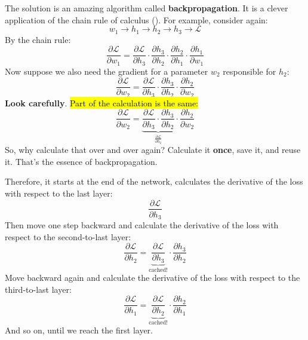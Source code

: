 \begin{remarkbox}
    \highspace
    \textcolor{Green3}{} The solution is an amazing algorithm called \textbf{backpropagation}. It is a clever application of the chain rule of calculus (). For example, consider again:
    \begin{equation*}
        w_1 \to h_1 \to h_2 \to h_3 \to \mathcal{L}
    \end{equation*}
    By the chain rule:
    \begin{equation*}
        \frac{\partial\mathcal{L}}{\partial w_1}
        =
        \frac{\partial\mathcal{L}}{\partial h_3} \cdot
        \frac{\partial h_3}{\partial h_2} \cdot
        \frac{\partial h_2}{\partial h_1} \cdot
        \frac{\partial h_1}{\partial w_1}
    \end{equation*}
    Now suppose we also need the gradient for a parameter $w_2$ responsible for $h_2$:
    \begin{equation*}
        \frac{\partial\mathcal{L}}{\partial w_2}
        =
        \frac{\partial\mathcal{L}}{\partial h_3} \cdot
        \frac{\partial h_3}{\partial h_2} \cdot
        \frac{\partial h_2}{\partial w_2}
    \end{equation*}
    \textbf{Look carefully}. \hl{Part of the calculation is the same:}
    \begin{equation*}
        \frac{\partial\mathcal{L}}{\partial w_2}
        =
        \underbrace{\frac{\partial\mathcal{L}}{\partial h_3} \cdot
        \frac{\partial h_3}{\partial h_2}}_{\frac{\partial\mathcal{L}}{\partial h_2}} \cdot
        \frac{\partial h_2}{\partial w_2}
    \end{equation*}
    So, why calculate that over and over again? Calculate it \textbf{once}, save it, and reuse it. That's the essence of backpropagation.

    \highspace
    Therefore, it starts at the end of the network, calculates the derivative of the loss with respect to the last layer:
    \begin{equation*}
        \frac{\partial\mathcal{L}}{\partial h_3}
    \end{equation*}
    Then move one step backward and calculate the derivative of the loss with respect to the second-to-last layer:
    \begin{equation*}
        \frac{\partial\mathcal{L}}{\partial h_2}
        =
        \underbrace{\frac{\partial\mathcal{L}}{\partial h_3}}_{\text{cached!}} \cdot
        \frac{\partial h_3}{\partial h_2}
    \end{equation*}
    Move backward again and calculate the derivative of the loss with respect to the third-to-last layer:
    \begin{equation*}
        \frac{\partial\mathcal{L}}{\partial h_1}
        =
        \underbrace{\frac{\partial\mathcal{L}}{\partial h_2}}_{\text{cached!}} \cdot
        \frac{\partial h_2}{\partial h_1}
    \end{equation*}
    And so on, until we reach the first layer.


\end{remarkbox}
